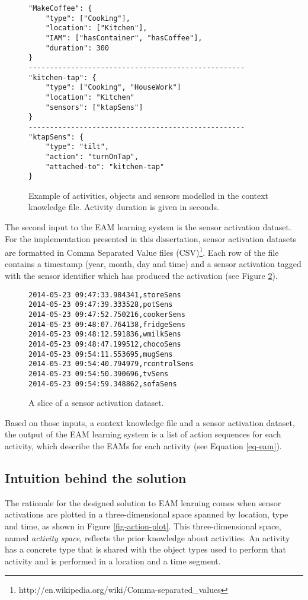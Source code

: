 \begin{figure}[htbp]
\begin{small}
\begin{lstlisting}
"MakeCoffee": {
	"type": ["Cooking"],
	"location": ["Kitchen"],
	"IAM": ["hasContainer", "hasCoffee"],
	"duration": 300
}
---------------------------------------------------
"kitchen-tap": {
	"type": ["Cooking", "HouseWork"]
	"location": "Kitchen"
	"sensors": ["ktapSens"]
}
---------------------------------------------------
"ktapSens": {
	"type": "tilt",
	"action": "turnOnTap",
	"attached-to": "kitchen-tap"
}
\end{lstlisting}
\end{small}
\caption{Example of activities, objects and sensors modelled in the context knowledge file. Activity duration is given in seconds.}
\label{fig-context-json}
\end{figure}

The second input to the EAM learning system is the sensor activation dataset. For the implementation presented in this dissertation, sensor activation datasets are formatted in Comma Separated Value files (CSV)\footnote{http://en.wikipedia.org/wiki/Comma-separated\_values}. Each row of the file contains a timestamp (year, month, day and time) and a sensor activation tagged with the sensor identifier which has produced the activation (see Figure \ref{fig-dataset}).


\begin{figure}[htbp]
\begin{small}
\begin{lstlisting}
2014-05-23 09:47:33.984341,storeSens
2014-05-23 09:47:39.333528,potSens
2014-05-23 09:47:52.750216,cookerSens
2014-05-23 09:48:07.764138,fridgeSens
2014-05-23 09:48:12.591836,wmilkSens
2014-05-23 09:48:47.199512,chocoSens
2014-05-23 09:54:11.553695,mugSens
2014-05-23 09:54:40.794979,rcontrolSens
2014-05-23 09:54:50.390696,tvSens
2014-05-23 09:54:59.348862,sofaSens
\end{lstlisting}
\end{small}
\caption{A slice of a sensor activation dataset.}
\label{fig-dataset}
\end{figure}

Based on those inputs, a context knowledge file and a sensor activation dataset, the output of the EAM learning system is a list of action sequences for each activity, which describe the EAMs for each activity (see Equation \ref{eq-eam}). 

\subsection{Intuition behind the solution}
\label{subsec:approach:intuition}
The rationale for the designed solution to EAM learning comes when sensor activations are plotted in a three-dimensional space spanned by location, type and time, as shown in Figure \ref{fig-action-plot}. This three-dimensional space, named \textit{activity space}, reflects the prior knowledge about activities. An activity has a concrete type that is shared with the object types used to perform that activity and is performed in a location and a time segment. 

